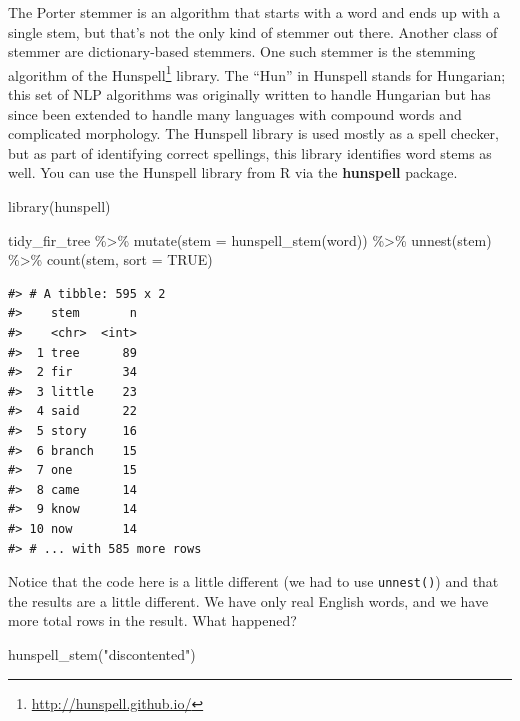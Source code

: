 \documentclass[
]{krantz}
\makeatletter
\newenvironment{Shaded}{\begin{snugshade}}{\end{snugshade}}
\newcommand{\AttributeTok}[1]{\textcolor[rgb]{0.77,0.63,0.00}{#1}}
\newcommand{\ConstantTok}[1]{\textcolor[rgb]{0.00,0.00,0.00}{#1}}
\newcommand{\FunctionTok}[1]{\textcolor[rgb]{0.00,0.00,0.00}{#1}}
\newcommand{\NormalTok}[1]{#1}
\newcommand{\SpecialCharTok}[1]{\textcolor[rgb]{0.00,0.00,0.00}{#1}}
\newcommand{\StringTok}[1]{\textcolor[rgb]{0.31,0.60,0.02}{#1}}
\DeclareRobustCommand{\href}[2]{#2\footnote{\url{#1}}}
\renewcommand{\href}[2]{#2\footnote{\url{#1}}}
\newenvironment{kframe}{%
\medskip{}
\setlength{\fboxsep}{.8em}
 \def\at@end@of@kframe{}%
 \ifinner\ifhmode%
  \def\at@end@of@kframe{\end{minipage}}%
  \begin{minipage}{\columnwidth}%
 \fi\fi%
 \def\FrameCommand##1{\hskip\@totalleftmargin \hskip-\fboxsep
 \colorbox{shadecolor}{##1}\hskip-\fboxsep
     \hskip-\linewidth \hskip-\@totalleftmargin \hskip\columnwidth}%
 \MakeFramed {\advance\hsize-\width
   \@totalleftmargin\z@ \linewidth\hsize
   \@setminipage}}%
 {\par\unskip\endMakeFramed%
 \at@end@of@kframe}
\renewenvironment{Shaded}{\begin{kframe}}{\end{kframe}}
\makeatother
\begin{document}
The Porter stemmer is an algorithm that starts with a word and ends up with a single stem, but that's not the only kind of stemmer out there. Another class of stemmer are dictionary-based stemmers. One such stemmer is the stemming algorithm of the \href{http://hunspell.github.io/}{Hunspell} library. The ``Hun'' in Hunspell stands for Hungarian; this set of NLP algorithms was originally written to handle Hungarian but has since been extended to handle many languages with compound words and complicated morphology. The Hunspell library is used mostly as a spell checker, but as part of identifying correct spellings, this library identifies word stems as well. You can use the Hunspell library from R via the \textbf{hunspell} \citep{R-hunspell} package.

\begin{Shaded}
\begin{Highlighting}[]
\FunctionTok{library}\NormalTok{(hunspell)}

\NormalTok{tidy\_fir\_tree }\SpecialCharTok{\%\textgreater{}\%}
  \FunctionTok{mutate}\NormalTok{(}\AttributeTok{stem =} \FunctionTok{hunspell\_stem}\NormalTok{(word)) }\SpecialCharTok{\%\textgreater{}\%}
  \FunctionTok{unnest}\NormalTok{(stem) }\SpecialCharTok{\%\textgreater{}\%}
  \FunctionTok{count}\NormalTok{(stem, }\AttributeTok{sort =} \ConstantTok{TRUE}\NormalTok{)}
\end{Highlighting}
\end{Shaded}

\begin{verbatim}
#> # A tibble: 595 x 2
#>    stem       n
#>    <chr>  <int>
#>  1 tree      89
#>  2 fir       34
#>  3 little    23
#>  4 said      22
#>  5 story     16
#>  6 branch    15
#>  7 one       15
#>  8 came      14
#>  9 know      14
#> 10 now       14
#> # ... with 585 more rows
\end{verbatim}

Notice that the code here is a little different (we had to use \texttt{unnest()}) and that the results are a little different. We have only real English words, and we have more total rows in the result. What happened?

\begin{Shaded}
\begin{Highlighting}[]
\FunctionTok{hunspell\_stem}\NormalTok{(}\StringTok{"discontented"}\NormalTok{)}
\end{Highlighting}
\end{Shaded}
\end{document}
